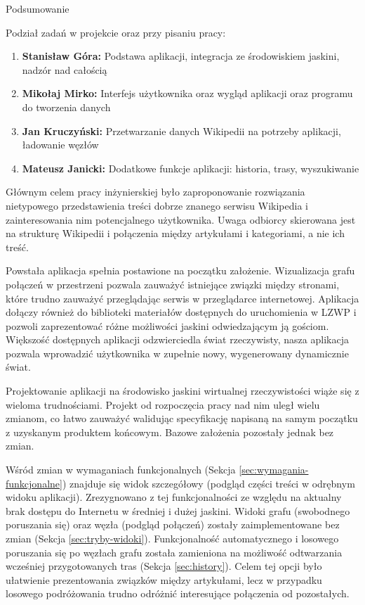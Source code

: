 \begin{chapter}{Podsumowanie}
	\newcommand{\chapterPath}{rozdzialy/7_podsumowanie}
	\label{ch:podsumowanie}

	\noindent Podział zadań w projekcie oraz przy pisaniu pracy:
	\begin{enumerate}[label=\textbullet]
		\item \textbf{Stanisław Góra:} Podstawa aplikacji, integracja ze środowiskiem jaskini, nadzór nad całością
		\item \textbf{Mikołaj Mirko:} Interfejs użytkownika oraz wygląd aplikacji oraz programu do tworzenia danych
		\item \textbf{Jan Kruczyński:} Przetwarzanie danych Wikipedii na potrzeby aplikacji, ładowanie węzłów
		\item \textbf{Mateusz Janicki:} Dodatkowe funkcje aplikacji: historia, trasy, wyszukiwanie
	\end{enumerate}
	
	Głównym celem pracy inżynierskiej było zaproponowanie rozwiązania nietypowego przedstawienia treści dobrze znanego serwisu Wikipedia i zainteresowania nim potencjalnego użytkownika. Uwaga odbiorcy skierowana jest na strukturę Wikipedii i połączenia między artykułami i kategoriami, a nie ich treść.

	Powstała aplikacja spełnia postawione na początku założenie. Wizualizacja grafu połączeń w przestrzeni pozwala zauważyć istniejące związki między stronami, które trudno zauważyć przeglądając serwis w przeglądarce internetowej. Aplikacja dołączy również do biblioteki materiałów dostępnych do uruchomienia w LZWP i pozwoli zaprezentować różne możliwości jaskini odwiedzającym ją gościom. Większość dostępnych aplikacji odzwierciedla świat rzeczywisty, nasza aplikacja pozwala wprowadzić użytkownika w zupełnie nowy, wygenerowany dynamicznie świat.

	Projektowanie aplikacji na środowisko jaskini wirtualnej rzeczywistości wiąże się z wieloma trudnościami. Projekt od rozpoczęcia pracy nad nim uległ wielu zmianom, co łatwo zauważyć walidując specyfikację napisaną na samym początku z uzyskanym produktem końcowym. Bazowe założenia pozostały jednak bez zmian.

	Wśród zmian w wymaganiach funkcjonalnych (Sekcja \ref{sec:wymagania-funkcjonalne}) znajduje się widok szczegółowy (podgląd części treści w odrębnym widoku aplikacji). Zrezygnowano z tej funkcjonalności ze względu na aktualny brak dostępu do Internetu w średniej i dużej jaskini. Widoki grafu (swobodnego poruszania się) oraz węzła (podgląd połączeń) zostały zaimplementowane bez zmian (Sekcja \ref{sec:tryby-widoki}). Funkcjonalność automatycznego i losowego poruszania się po węzłach grafu została zamieniona na możliwość odtwarzania wcześniej przygotowanych tras (Sekcja \ref{sec:history}). Celem tej opcji było ułatwienie prezentowania związków między artykułami, lecz w przypadku losowego podróżowania trudno odróżnić interesujące połączenia od pozostałych.


\end{chapter}
